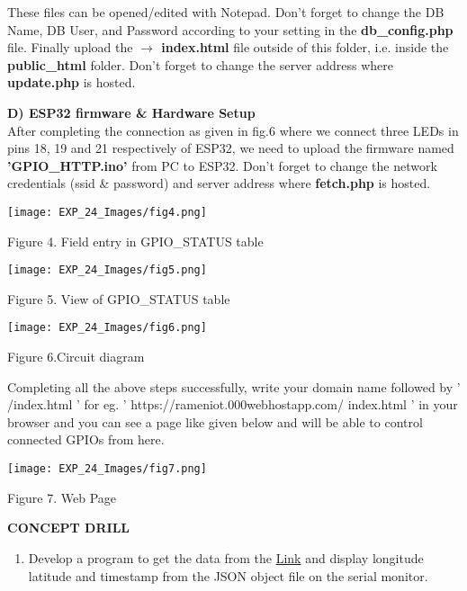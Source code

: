 \documentclass[12pt,a4paper]{article}
\begin{document}
\begin{justify}
\begin{enumerate}
These files can be opened/edited with Notepad. Don't forget to change the DB Name, DB User, and Password according to your setting in the\textbf{ db\_config.php} file.
Finally upload the \textbf{$ \rightarrow $ index.html} file outside of this folder, i.e. inside the \textbf{public\_html} folder. Don't forget to change the server address where \textbf{update.php} is hosted.

\end{enumerate}

\noindent \textbf{D) ESP32 firmware & Hardware Setup}\\[3pt]
After completing the connection as given in fig.6 where we connect three LEDs in pins 18, 19 and 21 respectively of ESP32, we need to upload the firmware named \textbf{'GPIO\_HTTP.ino'} from PC to ESP32. Don't forget to change the network credentials (ssid \& password) and server address where \textbf{fetch.php} is hosted.

\begin{center} 
\texttt{[image: EXP\_24\_Images/fig4.png]}
\end{center}
\begin{center} {Figure 4. Field entry in GPIO\_STATUS table }\end{center}

\begin{center} 
\texttt{[image: EXP\_24\_Images/fig5.png]}
\end{center}
\vspace{-3mm}
\begin{center} {Figure 5. View of GPIO\_STATUS table  }\end{center}

\begin{center} 
\texttt{[image: EXP\_24\_Images/fig6.png]}
\end{center}
\vspace{-3mm}
\begin{center} {Figure 6.Circuit diagram}\end{center}

\noindent Completing all the above steps successfully, write your domain name followed by ' /index.html ' for eg. ' https://rameniot.000webhostapp.com/ index.html '  in your browser and you can see a page like given below and will be able to control connected GPIOs from here.

\begin{center} 
\texttt{[image: EXP\_24\_Images/fig7.png]}
\end{center}
\begin{center} {Figure 7. Web Page}\end{center}

\vspace{10pt}
\noindent \textbf{\large CONCEPT DRILL}
\vspace{-6mm}
\begin{enumerate}
\setlength\itemsep{-0.3em}
\item  Develop a program to get the data from the \href {https://api.wheretheiss.at/v1/satellites/25544}{Link} and display longitude latitude and timestamp from the JSON object file on the serial monitor.
\end{enumerate}
\end{justify}
\end{document}

